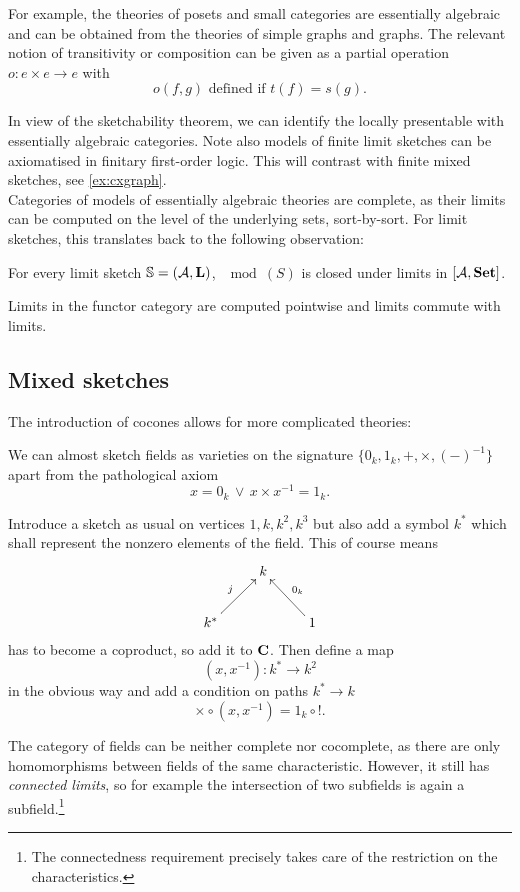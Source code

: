 For example, the theories of posets and small categories are essentially algebraic and can be obtained from the theories of simple graphs and graphs. The relevant notion of transitivity or composition can be given as a partial operation $o : e \times e \to e$ with
\[ o(f, g) \text{ defined if } t(f) = s(g). \]

In view of the sketchability theorem, we can identify the locally presentable with essentially algebraic categories. Note also models of finite limit sketches can be axiomatised in finitary first-order logic. This will contrast with finite mixed sketches, see \ref{ex:cxgraph}. \\

Categories of models of essentially algebraic theories are complete, as their limits can be computed on the level of the underlying sets, sort-by-sort. For limit sketches, this translates back to the following observation:

\begin{Proposition}
For every limit sketch $\mathbb S = (\mathcal{A}, \textbf{L})$, $\mod(S)$ is closed under limits in $[\mathcal{A},\mathbf{Set}]$.
\end{Proposition}
\begin{Proof}
Limits in the functor category are computed pointwise and limits commute with limits.
\end{Proof}

\subsection{Mixed sketches}
The introduction of cocones allows for more complicated theories:

\begin{Example}[Fields]
We can almost sketch fields as varieties on the signature $\{0_k,1_k,+,\times,(-)^{-1}\}$ apart from the pathological axiom
\[ x = 0_k \,\vee\,x \times x^{-1} = 1_k. \] 

Introduce a sketch as usual on vertices $1,k,k^2,k^3$ but also add a symbol $k^*$ which shall represent the nonzero elements of the field. This of course means
\[
\xymatrix{
& k & \\
k^* \ar[ru]^{j} & & 1 \ar[lu]_{0_k}
}\]
has to become a coproduct, so add it to $\textbf{C}$. Then define a map 
\[ (x,x^{-1}) : k^* \to k^2 \]
in the obvious way and add a condition on paths $k^* \to k$
\[ \times \circ (x,x^{-1}) = 1_k \circ !. \]
\end{Example}

The category of fields can be neither complete nor cocomplete, as there are only homomorphisms between fields of the same characteristic. However, it still has \emph{connected limits}, so for example the intersection of two subfields is again a subfield.\footnote{The connectedness requirement precisely takes care of the restriction on the characteristics.} \\

